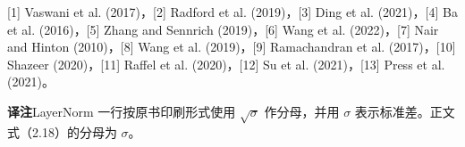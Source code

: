 \begin{table}[!htbp]
\medskip
\begin{minipage}{\linewidth}
[1] Vaswani et al. (2017)，[2] Radford et al. (2019)，[3] Ding et al. (2021)，[4] Ba et al. (2016)，[5] Zhang and Sennrich (2019)，[6] Wang et al. (2022)，[7] Nair and Hinton (2010)，[8] Wang et al. (2019)，[9] Ramachandran et al. (2017)，[10] Shazeer (2020)，[11] Raffel et al. (2020)，[12] Su et al. (2021)，[13] Press et al. (2021)。
\par\smallskip
\textbf{译注}\quad LayerNorm 一行按原书印刷形式使用 $\sqrt{\sigma}$ 作分母，并用 $\sigma$ 表示标准差。正文式（2.18）的分母为 $\sigma$。
\end{minipage}
\end{table}
